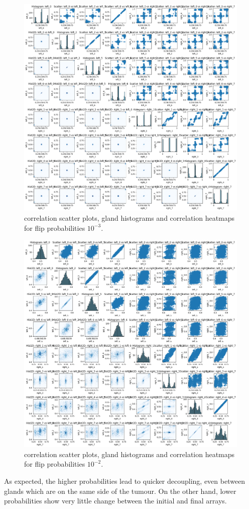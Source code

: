 \begin{figure}[h]
    \centering
    \includegraphics[width=\textwidth]{Chapter_methylation/figures/sensitivity_flipprob2.png}
    \caption{correlation scatter plots, gland histograms and correlation heatmaps for flip probabilities $10^{-3}$.}
    \label{fig:sensitivity_flipprob2}
\end{figure}
\clearpage
\begin{figure}[h]
    \centering
    \includegraphics[width=\textwidth]{Chapter_methylation/figures/sensitivity_flipprob3.png}
    \caption{correlation scatter plots, gland histograms and correlation heatmaps for flip probabilities $10^{-2}$.}
    \label{fig:sensitivity_flipprob3}
\end{figure}
\clearpage
As expected, the higher probabilities lead to quicker decoupling, even between glands which are on the same side of the tumour. On the other hand, lower probabilities show very little change between the initial and final arrays.

